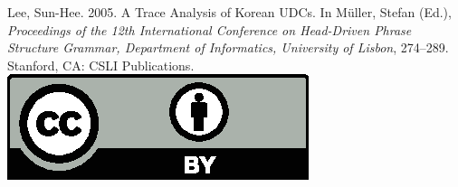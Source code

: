 \documentclass[a4paper,11pt]{article}
\begin{document}
\vfill
\noindent
Lee, Sun-Hee. 2005. A Trace Analysis of Korean UDCs. In Müller, Stefan (Ed.), \emph{{Proceedings of the 12th International Conference on Head-Driven Phrase Structure Grammar, Department of Informatics, University of Lisbon}}, 274--289. Stanford,
CA: CSLI Publications. \hfill\href{http://creativecommons.org/licenses/by/4.0/}{\includegraphics[height=.75em]{Includes/ccby.eps}}

\newpage

        
\end{document}
